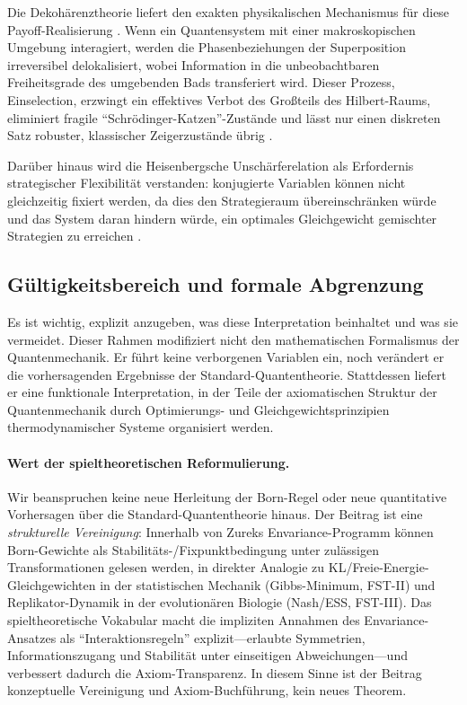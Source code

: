 \documentclass[12pt,a4paper]{article}
\theoremstyle{remark}
\begin{document}
Die Dekoh\"arenztheorie liefert den exakten physikalischen Mechanismus f\"ur diese Payoff-Realisierung \citep{MeasurementClassical}. Wenn ein Quantensystem mit einer makroskopischen Umgebung interagiert, werden die Phasenbeziehungen der Superposition irreversibel delokalisiert, wobei Information in die unbeobachtbaren Freiheitsgrade des umgebenden Bads transferiert wird. Dieser Prozess, Einselection, erzwingt ein effektives Verbot des Gro\ss{}teils des Hilbert-Raums, eliminiert fragile ``Schr\"odinger-Katzen''-Zust\"ande und l\"asst nur einen diskreten Satz robuster, klassischer Zeigerzust\"ande \"ubrig \citep{Zurek2003}.

Dar\"uber hinaus wird die Heisenbergsche Unsch\"arferelation als Erfordernis strategischer Flexibilit\"at verstanden: konjugierte Variablen k\"onnen nicht gleichzeitig fixiert werden, da dies den Strategieraum \"ubereinschr\"anken w\"urde und das System daran hindern w\"urde, ein optimales Gleichgewicht gemischter Strategien zu erreichen \citep{HeisenbergCovariant}.

\subsection{G\"ultigkeitsbereich und formale Abgrenzung}

Es ist wichtig, explizit anzugeben, was diese Interpretation beinhaltet und was sie vermeidet. Dieser Rahmen modifiziert nicht den mathematischen Formalismus der Quantenmechanik. Er f\"uhrt keine verborgenen Variablen ein, noch ver\"andert er die vorhersagenden Ergebnisse der Standard-Quantentheorie. Stattdessen liefert er eine funktionale Interpretation, in der Teile der axiomatischen Struktur der Quantenmechanik durch Optimierungs- und Gleichgewichtsprinzipien thermodynamischer Systeme organisiert werden.

\paragraph{Wert der spieltheoretischen Reformulierung.}
Wir beanspruchen keine neue Herleitung der Born-Regel oder neue quantitative Vorhersagen \"uber die Standard-Quantentheorie hinaus. Der Beitrag ist eine \emph{strukturelle Vereinigung}: Innerhalb von Zureks Envariance-Programm k\"onnen Born-Gewichte als Stabilit\"ats-/Fixpunktbedingung unter zul\"assigen Transformationen gelesen werden, in direkter Analogie zu KL/Freie-Energie-Gleichgewichten in der statistischen Mechanik (Gibbs-Minimum, FST-II) und Replikator-Dynamik in der evolution\"aren Biologie (Nash/ESS, FST-III). Das spieltheoretische Vokabular macht die impliziten Annahmen des Envariance-Ansatzes als ``Interaktionsregeln'' explizit---erlaubte Symmetrien, Informationszugang und Stabilit\"at unter einseitigen Abweichungen---und verbessert dadurch die Axiom-Transparenz. In diesem Sinne ist der Beitrag konzeptuelle Vereinigung und Axiom-Buchf\"uhrung, kein neues Theorem.
\end{document}
